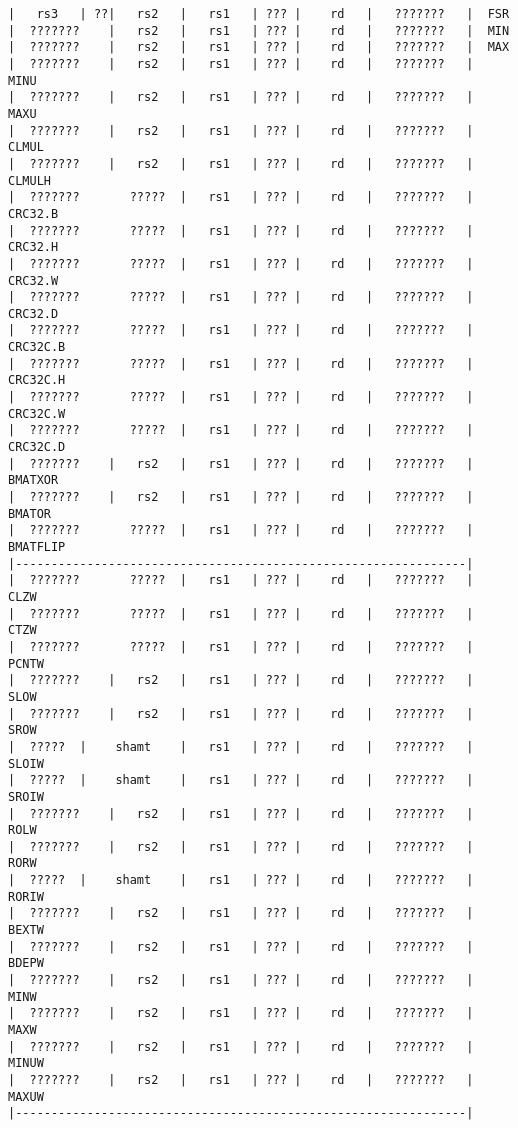 \begin{verbatim}
|   rs3   | ??|   rs2   |   rs1   | ??? |    rd   |   ???????   |  FSR
|  ???????    |   rs2   |   rs1   | ??? |    rd   |   ???????   |  MIN
|  ???????    |   rs2   |   rs1   | ??? |    rd   |   ???????   |  MAX
|  ???????    |   rs2   |   rs1   | ??? |    rd   |   ???????   |  MINU
|  ???????    |   rs2   |   rs1   | ??? |    rd   |   ???????   |  MAXU
|  ???????    |   rs2   |   rs1   | ??? |    rd   |   ???????   |  CLMUL
|  ???????    |   rs2   |   rs1   | ??? |    rd   |   ???????   |  CLMULH
|  ???????       ?????  |   rs1   | ??? |    rd   |   ???????   |  CRC32.B
|  ???????       ?????  |   rs1   | ??? |    rd   |   ???????   |  CRC32.H
|  ???????       ?????  |   rs1   | ??? |    rd   |   ???????   |  CRC32.W
|  ???????       ?????  |   rs1   | ??? |    rd   |   ???????   |  CRC32.D
|  ???????       ?????  |   rs1   | ??? |    rd   |   ???????   |  CRC32C.B
|  ???????       ?????  |   rs1   | ??? |    rd   |   ???????   |  CRC32C.H
|  ???????       ?????  |   rs1   | ??? |    rd   |   ???????   |  CRC32C.W
|  ???????       ?????  |   rs1   | ??? |    rd   |   ???????   |  CRC32C.D
|  ???????    |   rs2   |   rs1   | ??? |    rd   |   ???????   |  BMATXOR
|  ???????    |   rs2   |   rs1   | ??? |    rd   |   ???????   |  BMATOR
|  ???????       ?????  |   rs1   | ??? |    rd   |   ???????   |  BMATFLIP
|---------------------------------------------------------------|
|  ???????       ?????  |   rs1   | ??? |    rd   |   ???????   |  CLZW
|  ???????       ?????  |   rs1   | ??? |    rd   |   ???????   |  CTZW
|  ???????       ?????  |   rs1   | ??? |    rd   |   ???????   |  PCNTW
|  ???????    |   rs2   |   rs1   | ??? |    rd   |   ???????   |  SLOW
|  ???????    |   rs2   |   rs1   | ??? |    rd   |   ???????   |  SROW
|  ?????  |    shamt    |   rs1   | ??? |    rd   |   ???????   |  SLOIW
|  ?????  |    shamt    |   rs1   | ??? |    rd   |   ???????   |  SROIW
|  ???????    |   rs2   |   rs1   | ??? |    rd   |   ???????   |  ROLW
|  ???????    |   rs2   |   rs1   | ??? |    rd   |   ???????   |  RORW
|  ?????  |    shamt    |   rs1   | ??? |    rd   |   ???????   |  RORIW
|  ???????    |   rs2   |   rs1   | ??? |    rd   |   ???????   |  BEXTW
|  ???????    |   rs2   |   rs1   | ??? |    rd   |   ???????   |  BDEPW
|  ???????    |   rs2   |   rs1   | ??? |    rd   |   ???????   |  MINW
|  ???????    |   rs2   |   rs1   | ??? |    rd   |   ???????   |  MAXW
|  ???????    |   rs2   |   rs1   | ??? |    rd   |   ???????   |  MINUW
|  ???????    |   rs2   |   rs1   | ??? |    rd   |   ???????   |  MAXUW
|---------------------------------------------------------------|
\end{verbatim}

